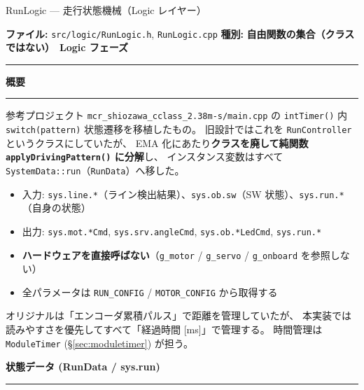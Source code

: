 \documentclass[a4paper,11pt,dvipdfmx]{jsarticle}
\makeatletter
\newcommand{\apisection}[1]{%
  \par\addvspace{4mm}%
  {\normalsize\bfseries\color{headerblue} #1}%
  \par\vspace{-1mm}%
  {\color{accentblue!40}\rule{\linewidth}{0.5pt}}%
  \par\nobreak\vspace{2mm}%
  \@afterheading
}
\newcommand{\phasebadge}[1]{%
  \colorbox{accentblue!10}{\small\bfseries\color{accentblue!80!black}\,#1\,}%
}
\makeatother
\begin{document}
\begin{apibox}{RunLogic --- 走行状態機械（Logic レイヤー）}

\textbf{ファイル:} \texttt{src/logic/RunLogic.h}, \texttt{RunLogic.cpp} \hfill
\textbf{種別:} \textbf{自由関数の集合（クラスではない）} \hfill
\phasebadge{Logic フェーズ}

\vspace{2mm}\hrule\vspace{2mm}

\apisection{概要}

参考プロジェクト \texttt{mcr\_shiozawa\_cclass\_2.38m-s/main.cpp} の
\texttt{intTimer()} 内 \texttt{switch(pattern)} 状態遷移を移植したもの。
旧設計ではこれを \texttt{RunController} というクラスにしていたが、
EMA 化にあたり\textbf{クラスを廃して純関数 \texttt{applyDrivingPattern()} に分解}し、
インスタンス変数はすべて \texttt{SystemData::run}（\texttt{RunData}）へ移した。

\begin{itemize}[nosep]
  \item 入力: \texttt{sys.line.*}（ライン検出結果）、\texttt{sys.ob.sw}（SW 状態）、\texttt{sys.run.*}（自身の状態）
  \item 出力: \texttt{sys.mot.*Cmd}, \texttt{sys.srv.angleCmd}, \texttt{sys.ob.*LedCmd}, \texttt{sys.run.*}
  \item \textbf{ハードウェアを直接呼ばない}（\texttt{g\_motor} / \texttt{g\_servo} / \texttt{g\_onboard} を参照しない）
  \item 全パラメータは \texttt{RUN\_CONFIG} / \texttt{MOTOR\_CONFIG} から取得する
\end{itemize}

オリジナルは「エンコーダ累積パルス」で距離を管理していたが、
本実装では読みやすさを優先してすべて「経過時間 [ms]」で管理する。
時間管理は \texttt{ModuleTimer} (\hyperref[sec:moduletimer]{§\ref*{sec:moduletimer}}) が担う。

\apisection{状態データ (RunData / sys.run)}


\end{apibox}
\end{document}
